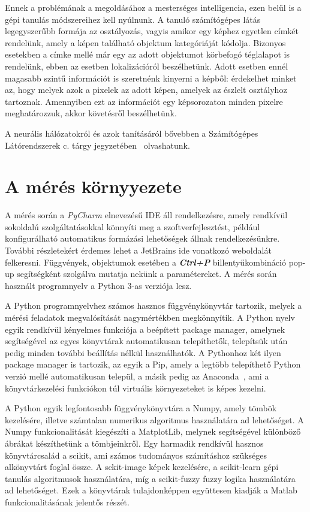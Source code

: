 \documentclass[12pt,a4paper,oneside]{report}             %
\begin{document}
Ennek a problémának a megoldásához a mesterséges intelligencia, ezen belül is a gépi tanulás módszereihez kell nyúlnunk. A tanuló számítógépes látás legegyszerűbb formája az osztályozás, vagyis amikor egy képhez egyetlen címkét rendelünk, amely a képen található objektum kategóriáját kódolja. Bizonyos esetekben a címke mellé már egy az adott objektumot körbefogó téglalapot is rendelünk, ebben az esetben lokalizációról beszélhetünk. Adott esetben ennél magasabb szintű információt is szeretnénk kinyerni a képből: érdekelhet minket az, hogy melyek azok a pixelek az adott képen, amelyek az észlelt osztályhoz tartoznak. Amennyiben ezt az információt egy képsorozaton minden pixelre meghatározzuk, akkor követésről beszélhetünk.

A neurális hálózatokról és azok tanításáról bővebben a Számítógépes Látórendszerek c. tárgy jegyzetében~\cite{szgl} olvashatunk.

\chapter{A mérés környyezete}

A mérés során a \emph{PyCharm} elnevezésű IDE áll rendelkezésre, amely rendkívül sokoldalú szolgáltatásokkal könnyíti meg a szoftverfejlesztést, például konfigurálható automatikus formázási lehetőségek állnak rendelkezésünkre. További részletekért érdemes lehet a JetBrains ide vonatkozó weboldalát~\cite{pycharm} felkeresni. Függvények, objektumok esetében a \textbf{\textit{Ctrl+P}} billentyűkombináció pop-up segítségként szolgálva mutatja nekünk a paramétereket. A mérés során használt programnyelv a Python 3-as verziója lesz.

A Python programnyelvhez számos hasznos függvénykönyvtár tartozik, melyek a mérési feladatok megvalósítását nagymértékben megkönnyítik. A Python nyelv egyik rendkívül kényelmes funkciója a beépített package manager, amelynek segítségével az egyes könyvtárak automatikusan telepíthetők, telepítsük után pedig minden további beállítás nélkül használhatók. A Pythonhoz két ilyen package manager is tartozik, az egyik a Pip, amely a legtöbb telepíthető Python verzió mellé automatikusan települ, a másik pedig az Anaconda~\cite{conda}, ami a könyvtárkezelési funkciókon túl virtuális környezeteket is képes kezelni.

A Python egyik legfontosabb függvénykönyvtára a Numpy, amely tömbök kezelésére, illetve számtalan numerikus algoritmus használatára ad lehetőséget. A Numpy funkcionalitását kiegészíti a MatplotLib, melynek segítségével különböző ábrákat készíthetünk a tömbjeinkről. Egy harmadik rendkívül hasznos könyvtárcsalád a scikit, ami számos tudományos számításhoz szükséges alkönyvtárt foglal össze. A sckit-image képek kezelésére, a scikit-learn gépi tanulás algoritmusok használatára, míg a scikit-fuzzy fuzzy logika használatára ad lehetőséget. Ezek a könyvtárak tulajdonképpen együttesen kiadják a Matlab funkcionalitásának jelentős részét.
\end{document}
